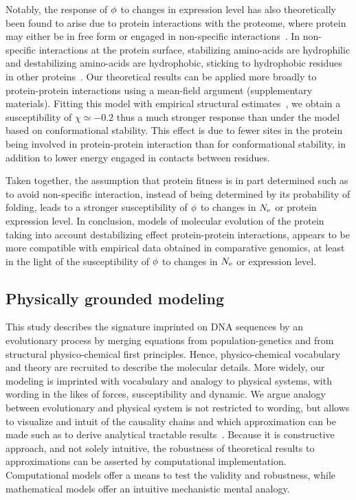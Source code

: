 Notably, the response of $\phi$ to changes in expression level has also theoretically been found to arise due to protein interactions with the proteome, where protein may either be in free form or engaged in non-specific interactions~\citep{Yang2012, Zhang2013}.
In non-specific interactions at the protein surface, stabilizing amino-acids are hydrophilic and destabilizing amino-acids are hydrophobic, sticking to hydrophobic residues in other proteins~\citep{Dixit2013,Manhart2015}.
Our theoretical results can be applied more broadly to protein-protein interactions using a mean-field argument (supplementary materials).
Fitting this model with empirical structural estimates~\citep{Janin1995a, Zhang2008}, we obtain a susceptibility of $\chi \simeq -0.2$ thus a much stronger response than under the model based on conformational stability.
This effect is due to fewer sites in the protein being involved in protein-protein interaction than for conformational stability, in addition to lower energy engaged in contacts between residues.

Taken together, the assumption that protein fitness is in part determined such as to avoid non-specific interaction, instead of being determined by its probability of folding, leads to a stronger susceptibility of $\phi$ to changes in $N_{\mathrm{e}}$ or protein expression level.
In conclusion, models of molecular evolution of the protein taking into account destabilizing effect protein-protein interactions, appears to be more compatible with empirical data obtained in comparative genomics, at least in the light of the susceptibility of $\phi$ to changes in $N_{\mathrm{e}}$ or expression level.

\subsection{Physically grounded modeling}
This study describes the signature imprinted on \acrshort{DNA} sequences by an evolutionary process by merging equations from population-genetics and from structural physico-chemical first principles.
Hence, physico-chemical vocabulary and theory are recruited to describe the molecular details.
More widely, our modeling is imprinted with vocabulary and analogy to physical systems, with wording in the likes of forces, susceptibility and dynamic.
We argue analogy between evolutionary and physical system is not restricted to wording, but allows to visualize and intuit of the causality chains and which approximation can be made such as to derive analytical tractable results~\citep{Sella2005, Mustonen2009, Bastolla2012, Bastolla2017}.
Because it is constructive approach, and not solely intuitive, the robustness of theoretical results to approximations can be asserted by computational implementation.
Computational models offer a means to test the validity and robustness, while mathematical models offer an intuitive mechanistic mental analogy.

